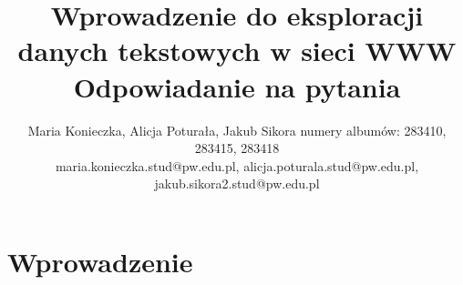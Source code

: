 \documentclass{article}
\title{Wprowadzenie do eksploracji danych tekstowych w sieci WWW\\ Odpowiadanie na pytania}
\author{
Maria Konieczka, Alicja Poturała, Jakub Sikora
\affiliations
numery albumów: 283410, 283415, 283418 \\
\emails
maria.konieczka.stud@pw.edu.pl, alicja.poturala.stud@pw.edu.pl, jakub.sikora2.stud@pw.edu.pl
}
\begin{document}
\maketitle

\section{Wprowadzenie}
\label{sec:wprowadzenie}




\end{document}
